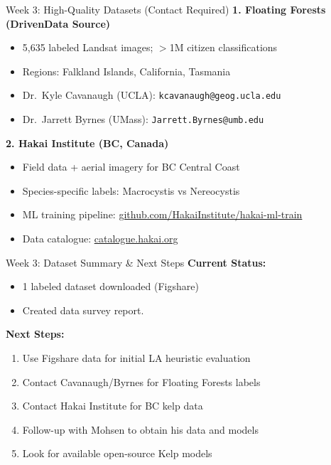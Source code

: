 \documentclass[10pt,xcolor={table,dvipsnames},t]{beamer}
\begin{document}
\begin{frame}{Week 3: High-Quality Datasets (Contact Required)}
\small
\textbf{1. Floating Forests (DrivenData Source)}
\begin{itemize}
  \item 5,635 labeled Landsat images; $>$1M citizen classifications
  \item Regions: Falkland Islands, California, Tasmania
  \item Dr.\ Kyle Cavanaugh (UCLA): \texttt{kcavanaugh@geog.ucla.edu}
  \item Dr.\ Jarrett Byrnes (UMass): \texttt{Jarrett.Byrnes@umb.edu}
\end{itemize}

\vspace{0.3em}
\textbf{2. Hakai Institute (BC, Canada)}
\begin{itemize}
  \item Field data + aerial imagery for BC Central Coast
  \item Species-specific labels: Macrocystis vs Nereocystis
  \item ML training pipeline: \url{github.com/HakaiInstitute/hakai-ml-train}
  \item Data catalogue: \url{catalogue.hakai.org}
\end{itemize}

\end{frame}

\begin{frame}{Week 3: Dataset Summary \& Next Steps}
\small
\textbf{Current Status:}
\begin{itemize}
  \item \textcolor{green}{\checkmark} 1 labeled dataset downloaded (Figshare)
  \item \textcolor{green}{\checkmark} Created data survey report.
\end{itemize}

\vspace{0.3em}
\textbf{Next Steps:}
\begin{enumerate}
  \item Use Figshare data for initial LA heuristic evaluation
  \item Contact Cavanaugh/Byrnes for Floating Forests labels
  \item Contact Hakai Institute for BC kelp data
  \item Follow-up with Mohsen to obtain his data and models
  \item Look for available open-source Kelp models
\end{enumerate}

\end{frame}


\end{document}
